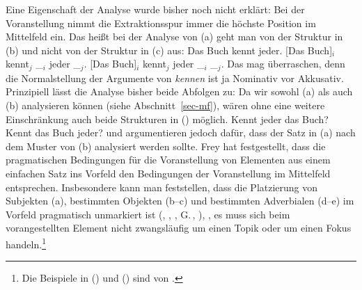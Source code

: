 Eine Eigenschaft der Analyse wurde bisher noch nicht erklärt: Bei der Voranstellung nimmt
die Extraktionsspur immer die höchste Position im Mittelfeld ein. Das heißt bei der Analyse
von (a) geht man von der Struktur in (b) und nicht von der Struktur in (c) aus:
\eal
\ex Das Buch kennt jeder.
\ex {}[Das Buch]$_i$ kennt$_j$ \_$_i$ jeder \_$_j$.
\ex {}[Das Buch]$_i$ kennt$_j$ jeder \_$_i$ \_$_j$.
\zl
Das mag überraschen, denn die Normalstellung der Argumente von \emph{kennen} ist ja Nominativ vor Akkusativ.
Prinzipiell lässt die Analyse bisher beide Abfolgen zu: Da wir sowohl (a) als auch (b)
analysieren können (siehe Abschnitt~\ref{sec-mf}), wären ohne eine weitere Einschränkung
auch beide Strukturen in () möglich.%
\eal
\ex Kennt jeder das Buch?
\ex Kennt das Buch jeder?
\zl
\citet{Fanselow2003d} und \citet{Frey2004a} argumentieren jedoch dafür, dass der Satz in (a) nach dem
Muster von (b) analysiert werden sollte. Frey hat festgestellt, dass die pragmatischen
Bedingungen für die Voranstellung von Elementen aus einem einfachen Satz ins Vorfeld den Bedingungen der Voranstellung
im Mittelfeld entsprechen. Insbesondere kann man feststellen, dass die Platzierung von Subjekten (a), 
bestimmten Objekten (b--c) und bestimmten Adverbialen (d--e) im Vorfeld pragmatisch
unmarkiert 
ist (\citealp{Lenerz77}, \citealp[--74]{Haider84c}, \citealp{Fanselow2003d},
G.\,\citealp[]{GMueller2004a}, \citealp{Frey2004a}),
\dash, es muss sich beim vorangestellten Element nicht zwangsläufig 
um einen Topik oder um einen Fokus handeln.\footnote{
  Die Beispiele in () und () sind von \citet[--6, 8]{Frey2004a}. 
}

